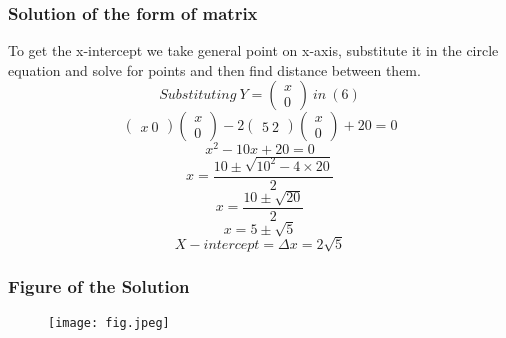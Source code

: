 \documentclass{beamer}
\begin{document}
\begin{frame}
\frametitle{Solution of the form of matrix}
To get the x-intercept we take general point on x-axis, substitute it in the circle equation and solve for points and then find distance between them.
$$ Substituting \ Y = \begin{pmatrix}x\\ 0 \end{pmatrix} \ in \ (6) $$
$$\begin{pmatrix}x\ 0 \end{pmatrix}\begin{pmatrix}x\\ 0 \end{pmatrix} - 2\begin{pmatrix}5\ 2 \end{pmatrix}\begin{pmatrix}x\\ 0 \end{pmatrix} + 20 = 0 $$
$$ x^2 -10x + 20 = 0 $$
$$ x = \frac{10\pm\sqrt{10^2-4\times20}}{2} $$
$$ x = \frac{10\pm\sqrt{20}}{2} $$
$$ x = 5 \pm \sqrt{5} $$
$$ X-intercept = \Delta{x} = 2\sqrt{5} $$
\end{frame}
 
\begin{frame}
\frametitle{Figure of the Solution}
\begin{figure}
\texttt{[image: fig.jpeg]}
\end{figure}
\end{frame}
 
\end{document}
